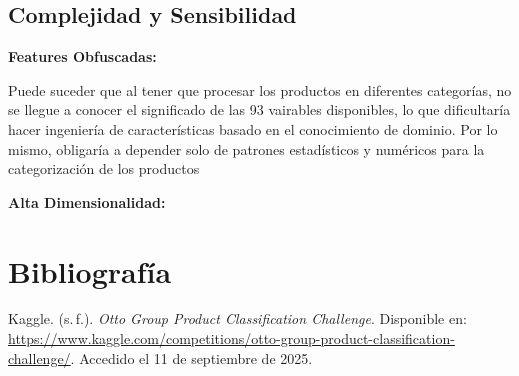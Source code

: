 \documentclass[12pt]{article}%
\begin{document}
\subsection{Complejidad y Sensibilidad}

\textbf{Features Obfuscadas: }

Puede suceder que al tener que procesar los productos en diferentes categorías, no se llegue a conocer el significado de las 93 vairables disponibles, lo que dificultaría hacer ingeniería de características basado en el conocimiento de dominio. Por lo mismo, obligaría a depender solo de patrones estadísticos y numéricos para la categorización de los productos

\textbf{Alta Dimensionalidad: }






\newpage
\section{Bibliografía}
    \begin{thebibliography}{99} %
    
    Kaggle. (s.\,f.). \textit{Otto Group Product Classification Challenge}.  
    Disponible en: \url{https://www.kaggle.com/competitions/otto-group-product-classification-challenge/}.  
    Accedido el 11 de septiembre de 2025.
    
    \end{thebibliography}
\end{document}
